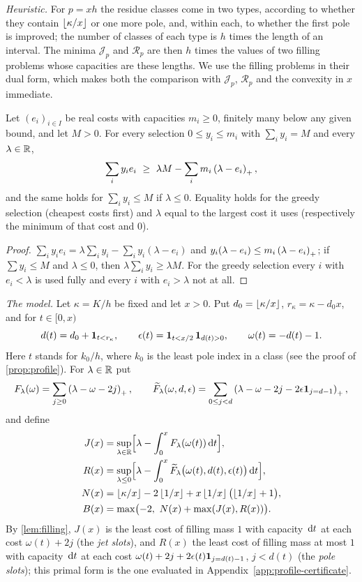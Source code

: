 \emph{Heuristic.} For $p=xh$ the residue classes come in two types, according to whether they
contain $\left\lfloor \kappa/x\right\rfloor$ or one more pole, and, within each, to whether the first pole is
improved; the number of classes of each type is $h$ times the length of an interval. The minima
$\mathcal J_p$ and $\mathcal R_p$ are then $h$ times the values of two filling problems whose
capacities are these lengths. We use the filling problems in their dual form, which makes both the
comparison with $\mathcal J_p$, $\mathcal R_p$ and the convexity in $x$ immediate.

\begin{lemma}\label{lem:filling}
Let $(e_i)_{i\in I}$ be real costs with capacities $m_i\ge0$, finitely many below any given
bound, and let $M>0$. For every selection $0\le y_i\le m_i$ with $\sum_iy_i=M$ and every
$\lambda\in\mathbb{R}$,
\[
  \sum_iy_ie_i\ \ge\ \lambda M-\sum_im_i\left(\lambda-e_i\right)_{+},
\]
and the same holds for $\sum_iy_i\le M$ if $\lambda\le0$. Equality holds for the greedy selection
(cheapest costs first) and $\lambda$ equal to the largest cost it uses (respectively the minimum of
that cost and $0$).
\end{lemma}

\begin{proof}
$\sum_iy_ie_i=\lambda\sum_iy_i-\sum_iy_i(\lambda-e_i)$ and
$y_i(\lambda-e_i)\le m_i\left(\lambda-e_i\right)_{+}$; if $\sum y_i\le M$ and $\lambda\le0$, then
$\lambda\sum_iy_i\ge\lambda M$. For the greedy selection every $i$ with $e_i<\lambda$ is used fully
and every $i$ with $e_i>\lambda$ not at all.
\end{proof}

\emph{The model.} Let $\kappa=K/h$ be fixed and let $x>0$. Put $d_0=\left\lfloor \kappa/x\right\rfloor$,
$r_\kappa=\kappa-d_0x$, and for $t\in[0,x)$
\[
  d(t)=d_0+\mathbf{1}_{t<r_\kappa},\qquad
  \epsilon(t)=\mathbf{1}_{t<x/2}\,\mathbf{1}_{d(t)>0},\qquad \omega(t)=-d(t)-1.
\]
Here $t$ stands for $k_0/h$, where $k_0$ is the least pole index in a class (see the proof of
\cref{prop:profile}). For $\lambda\in\mathbb{R}$ put
\[
  F_\lambda(\omega)=\sum_{j\ge0}\left(\lambda-\omega-2j\right)_{+},\qquad
  \widetilde F_\lambda(\omega,d,\epsilon)=\sum_{0\le j<d}\left(\lambda-\omega-2j-2\epsilon\mathbf{1}_{j=d-1}\right)_{+},
\]
and define
\begin{align*}
  J(x)&=\sup_{\lambda\in\mathbb{R}}\Bigl[\lambda-\int_0^xF_\lambda(\omega(t))\,\mathrm{d} t\Bigr],\\
  R(x)&=\sup_{\lambda\le0}\Bigl[\lambda-\int_0^x\widetilde F_\lambda\bigl(\omega(t),d(t),
  \epsilon(t)\bigr)\,\mathrm{d} t\Bigr],\\
  N(x)&=\left\lfloor \kappa/x\right\rfloor-2\left\lfloor 1/x\right\rfloor+x\left\lfloor 1/x\right\rfloor\bigl(\left\lfloor 1/x\right\rfloor+1\bigr),\\
  B(x)&=\max\bigl(-2,\ N(x)+\max(J(x),R(x))\bigr).
\end{align*}
By \cref{lem:filling}, $J(x)$ is the least cost of filling mass $1$ with capacity $\,\mathrm{d} t$ at each
cost $\omega(t)+2j$ (the \emph{jet slots}), and $R(x)$ the least cost of filling mass at most $1$
with capacity $\,\mathrm{d} t$ at each cost $\omega(t)+2j+2\epsilon(t)\mathbf{1}_{j=d(t)-1}$, $j<d(t)$ (the
\emph{pole slots}); this primal form is the one evaluated in Appendix~\ref{app:profile-certificate}.

